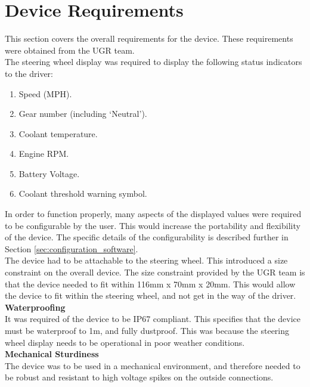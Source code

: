 \documentclass[a4paper,12pt]{article}
\begin{document}
\newpage
\section{Device Requirements}
\label{sec:device_requirements}

This section covers the overall requirements for the device. These requirements were obtained from the UGR team. \\

The steering wheel display was required to display the following status indicators to the driver:

\begin{enumerate}
  \item Speed (MPH).
  \item Gear number (including `Neutral').
  \item Coolant temperature.
  \item Engine RPM.
  \item Battery Voltage.
  \item Coolant threshold warning symbol.
\end{enumerate}

In order to function properly, many aspects of the displayed values were required to be configurable by the user. This would increase the portability and flexibility of the device. The specific details of the configurability is described further in Section \ref{sec:configuration_software}. \\

The device had to be attachable to the steering wheel. This introduced a size constraint on the overall device. The size constraint provided by the UGR team is that the device needed to fit within 116mm x 70mm x 20mm. This would allow the device to fit within the steering wheel, and not get in the way of the driver. \\

\textbf{Waterproofing} \\

It was required of the device to be IP67 compliant. This specifies that the device must be waterproof to 1m, and fully dustproof. This was because the steering wheel display needs to be operational in poor weather conditions. \\

\textbf{Mechanical Sturdiness} \\

The device was to be used in a mechanical environment, and therefore needed to be robust and resistant to high voltage spikes on the outside connections. \\
\end{document}
